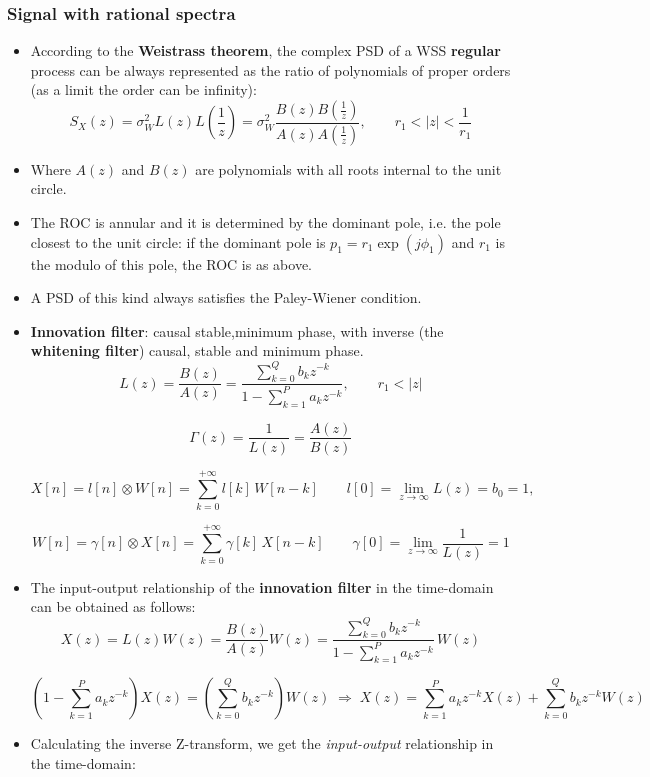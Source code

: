 \subsubsection{Signal with rational spectra}
\begin{itemize}
    \item According to the \textbf{Weistrass theorem}, the complex PSD of a WSS \textbf{regular} process can be always represented as the ratio of polynomials of proper orders (as a limit the order can be infinity):
\[
S_{X}(z)
= \sigma_{W}^{2} L(z)L\!\left(\frac{1}{z}\right)
= \sigma_{W}^{2} \frac{B(z)B\!\left(\frac{1}{z}\right)}
                      {A(z)A\!\left(\frac{1}{z}\right)},
\qquad
r_{1} < |z| < \frac{1}{r_{1}}
\]

    \item Where \(A(z)\) and \(B(z)\) are polynomials with all roots internal to the unit circle.
    \item The ROC is annular and it is determined by the dominant pole, i.e. the pole closest to the unit circle: if the dominant pole is \(p_1=r_1\exp(j\phi_1)\) and \(r_1\) is the modulo of this pole, the ROC is as above.
    \item A PSD of this kind always satisfies the Paley-Wiener condition.
    \item \textbf{Innovation filter}: causal stable,minimum phase, with inverse (the \textbf{whitening filter}) causal, stable and minimum phase.
    \[
L(z) = \frac{B(z)}{A(z)}
     = \frac{\displaystyle\sum_{k=0}^{Q} b_{k} z^{-k}}
            {\displaystyle 1 - \sum_{k=1}^{P} a_{k} z^{-k}},
\qquad r_{1} < |z|
\]

\[
\Gamma(z) = \frac{1}{L(z)} = \frac{A(z)}{B(z)}
\]

\[
X[n] = l[n] \otimes W[n]
     = \sum_{k=0}^{+\infty} l[k]\,W[n-k]\qquad l[0] = \lim_{z\to\infty} L(z) = b_{0} = 1,
\]

\[
W[n] = \gamma[n] \otimes X[n]
     = \sum_{k=0}^{+\infty} \gamma[k]\,X[n-k]\qquad\gamma[0] = \lim_{z\to\infty} \frac{1}{L(z)} = 1
\]

    \item The input-output relationship of the \textbf{innovation filter} in the time-domain can be obtained as follows:
    \[
X(z) = L(z)W(z)
     = \frac{B(z)}{A(z)} W(z)
     = \frac{\displaystyle\sum_{k=0}^{Q} b_{k} z^{-k}}
            {\displaystyle 1 - \sum_{k=1}^{P} a_{k} z^{-k}}\, W(z)
\]

\[
\left(1 - \sum_{k=1}^{P} a_{k} z^{-k}\right) X(z)
 = \left(\sum_{k=0}^{Q} b_{k} z^{-k}\right) W(z)
 \;\Longrightarrow\;
 X(z) = \sum_{k=1}^{P} a_{k} z^{-k} X(z) + \sum_{k=0}^{Q} b_{k} z^{-k} W(z)
\]
\item Calculating the inverse Z-transform, we get the \textit{input-output} relationship in the time-domain:



\end{itemize}
